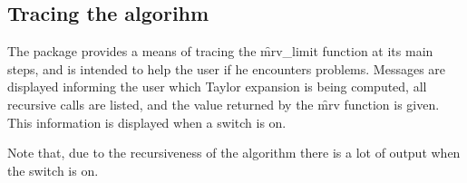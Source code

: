 \subsection{Tracing the algorihm}
The package provides a means of tracing the \f{mrv\_limit} function at
its main steps, and is intended to help the user if he encounters
problems. Messages are displayed informing the user which Taylor
expansion is being computed, all recursive calls are listed, and the
value returned by the \f{mrv} function is given. This information is
displayed when a switch  is on.
\iffalse
This is off by default,
but can be switched on with the command
\begin{verbatim}
on trlimit;
\end{verbatim}
Here is a simple example in \REDUCE:
\begin{verbatim}
1: load mrvlimit;

2: on trlimit;

3: mrv_limit(e^x,x,infinity);

mrv_f is {x}

                     x
After move_up, f is e

                        -1
performing taylor on: ww

                      -1
series expansion is ww

            -1
series is ww

exponent list is {expt,-1}

leading exponent e0 is {expt,-1}

           x
mrv_f is {e }

h is x

mrv_f is {x}

                     x
After move_up, f is e

                        -1
performing taylor on: ww

                      -1
series expansion is ww

            -1
series is ww

exponent list is {expt,-1}

leading exponent e0 is {expt,-1}

                            - x
small has been changed to e

                                 -1
After substitution to ww, f is ww

                        -1
performing taylor on: ww

                      -1
series expansion is ww

            -1
series is ww

exponent list is {expt,-1}

leading exponent e0 is {expt,-1}

infinity
\end{verbatim}
Note that, due to the recursiveness of the functions
\f{mrv} and \f{mrv\_limit}, many calls to each function are made, and
information is given on all calls when the \sw{trlimit} switch is on.
\fi

Note that, due to the recursiveness of the algorithm there is a lot of output
when the  switch is on. 